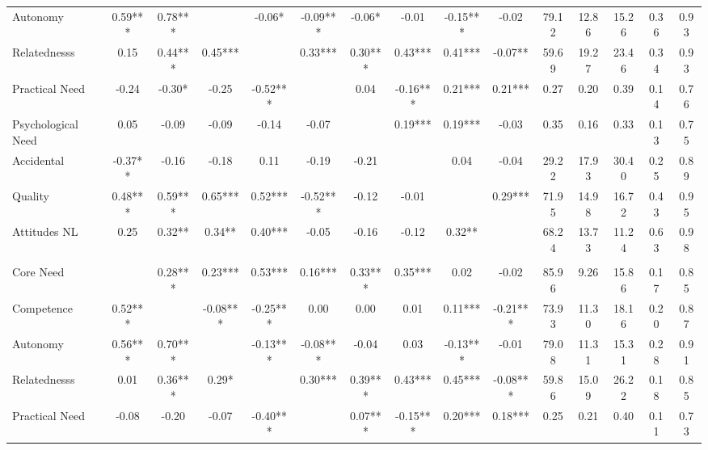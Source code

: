 \begin{table}
\begin{minipage}[t][\textheight][t]{\textwidth}
{\begin{tabular}[t]{lcccccccccccccc}
\hspace{1em}Autonomy & 0.59*** & 0.78*** &  & -0.06* & -0.09*** & -0.06* & -0.01 & -0.15*** & -0.02 & 79.12 & 12.86 & 15.26 & 0.36 & 0.93\\
\hspace{1em}Relatednesss & 0.15 & 0.44*** & 0.45*** &  & 0.33*** & 0.30*** & 0.43*** & 0.41*** & -0.07** & 59.69 & 19.27 & 23.46 & 0.34 & 0.93\\
\hspace{1em}Practical Need & -0.24 & -0.30* & -0.25 & -0.52*** &  & 0.04 & -0.16*** & 0.21*** & 0.21*** & 0.27 & 0.20 & 0.39 & 0.14 & 0.76\\
\hspace{1em}Psychological Need & 0.05 & -0.09 & -0.09 & -0.14 & -0.07 &  & 0.19*** & 0.19*** & -0.03 & 0.35 & 0.16 & 0.33 & 0.13 & 0.75\\
\hspace{1em}Accidental & -0.37** & -0.16 & -0.18 & 0.11 & -0.19 & -0.21 &  & 0.04 & -0.04 & 29.22 & 17.93 & 30.40 & 0.25 & 0.89\\
\hspace{1em}Quality & 0.48*** & 0.59*** & 0.65*** & 0.52*** & -0.52*** & -0.12 & -0.01 &  & 0.29*** & 71.95 & 14.98 & 16.72 & 0.43 & 0.95\\
\hspace{1em}Attitudes NL & 0.25 & 0.32** & 0.34** & 0.40*** & -0.05 & -0.16 & -0.12 & 0.32** &  & 68.24 & 13.73 & 11.24 & 0.63 & 0.98\\
\addlinespace[0.3em]
\multicolumn{15}{l}{\textbf{Across Studies}}\\
\hspace{1em}Core Need &  & 0.28*** & 0.23*** & 0.53*** & 0.16*** & 0.33*** & 0.35*** & 0.02 & -0.02 & 85.96 & 9.26 & 15.86 & 0.17 & 0.85\\
\hspace{1em}Competence & 0.52*** &  & -0.08*** & -0.25*** & 0.00 & 0.00 & 0.01 & 0.11*** & -0.21*** & 73.93 & 11.30 & 18.16 & 0.20 & 0.87\\
\hspace{1em}Autonomy & 0.56*** & 0.70*** &  & -0.13*** & -0.08*** & -0.04 & 0.03 & -0.13*** & -0.01 & 79.08 & 11.31 & 15.31 & 0.28 & 0.91\\
\hspace{1em}Relatednesss & 0.01 & 0.36*** & 0.29* &  & 0.30*** & 0.39*** & 0.43*** & 0.45*** & -0.08*** & 59.86 & 15.09 & 26.22 & 0.18 & 0.85\\
\hspace{1em}Practical Need & -0.08 & -0.20 & -0.07 & -0.40*** &  & 0.07*** & -0.15*** & 0.20*** & 0.18*** & 0.25 & 0.21 & 0.40 & 0.11 & 0.73\\

\end{tabular}}
\end{minipage}
\end{table}
